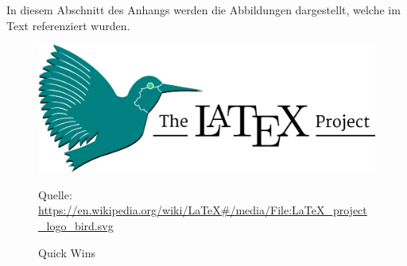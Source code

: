

In diesem Abschnitt des Anhangs werden die Abbildungen dargestellt, welche im Text referenziert wurden.







%



\begin{figure}[H]
	\centering
	\includegraphics[width=15cm]{anhaenge/abbildungen/the_latex_project.png}
	\caption[]{Quick Wins}
	\label{abb:quick_win}
	Quelle: \url{https://en.wikipedia.org/wiki/LaTeX#/media/File:LaTeX_project_logo_bird.svg}
\end{figure}


